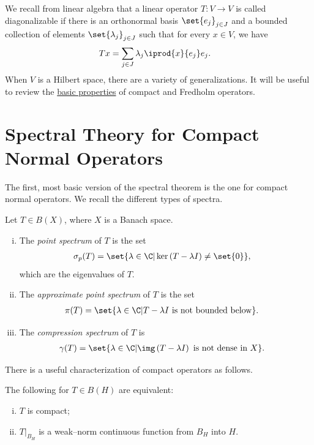 \documentclass[10pt]{mypackage}
\begin{document}
\RaggedRight
We recall from linear algebra that a linear operator $T\colon V\rightarrow V$ is called diagonalizable if there is an orthonormal basis $\set{e_j}_{j\in J}$ and a bounded collection of elements $\set{\lambda_j}_{j\in J}$ such that for every $x\in V$, we have
\begin{align*}
  Tx &= \sum_{j\in J}\lambda_j \iprod{x}{e_j}e_j.
\end{align*}
When $V$ is a Hilbert space, there are a variety of generalizations. It will be useful to review the \href{https://ai-bearing.github.io/Classes_and_Homework/Other Notes/compact_and_fredholm_operators.pdf}{basic properties} of compact and Fredholm operators.
\section{Spectral Theory for Compact Normal Operators}%
The first, most basic version of the spectral theorem is the one for compact normal operators. We recall the different types of spectra.
\begin{definition}
  Let $T\in B(X)$, where $X$ is a Banach space.
  \begin{enumerate}[(i)]
    \item The \textit{point spectrum} of $T$ is the set
      \begin{align*}
        \sigma_{p}(T) &= \set{\lambda\in \C | \ker\left( T-\lambda I \right)\neq \set{0}},
      \end{align*}
      which are the eigenvalues of $T$.
    \item The \textit{approximate point spectrum} of $T$ is the set
      \begin{align*}
        \pi(T) &= \set{\lambda\in \C | T-\lambda I\text{ is not bounded below}}.
      \end{align*}
    \item The \textit{compression spectrum} of $T$ is
      \begin{align*}
        \gamma(T) &= \set{\lambda\in \C | \img\left( T-\lambda I \right)\text{ is not dense in }X}.
      \end{align*}
  \end{enumerate}
\end{definition}
There is a useful characterization of compact operators as follows.
\begin{lemma}
  The following for $T\in B(H)$ are equivalent:
  \begin{enumerate}[(i)]
    \item $T$ is compact;
    \item $T|_{B_H}$ is a weak--norm continuous function from $B_H$ into $H$.
  \end{enumerate}
\end{lemma}
\end{document}
